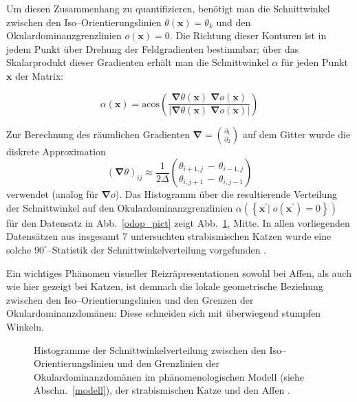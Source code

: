Um diesen Zusammenhang zu quantifizieren, benötigt man die Schnittwinkel
zwischen den Iso--Orientierungslinien $\theta(\mathbf{x})=\theta_k$ und den
Okulardominanzgrenzlinien $o(\mathbf{x}) = 0$.  Die Richtung dieser
Konturen ist in jedem Punkt über Drehung der Feldgradienten bestimmbar;
über das Skalarprodukt dieser Gradienten erhält man die Schnittwinkel
$\alpha$ für jeden Punkt $\mathbf{x}$ der Matrix:

\begin{equation*}
\alpha(\mathbf{x})=\text{acos}\!\left(\frac{\pmb\nabla\theta(\mathbf{x})
\;\pmb\nabla o(\mathbf{x})}{\vert\pmb\nabla\theta(\mathbf{x})\;\pmb\nabla
o(\mathbf{x})\vert}\right)
\end{equation*}

Zur Berechnung des räumlichen Gradienten $\pmb\nabla =
{\partial_1\choose\partial_2}$ auf dem Gitter wurde die diskrete
Approximation
\begin{equation*}
(\pmb\nabla\theta)_{ij}\approx\frac{1}{2\Delta}{{\theta_{i+1,j}\,-\,\theta_{i-1,j}}\choose{\theta_{i,j+1}\,-\,\theta_{i,j-1}}}
\end{equation*}
verwendet (analog für $\pmb\nabla o$). Das Histogramm über die
resultierende Verteilung der Schnittwinkel auf den
Okulardominanzgrenzlinien $\alpha(\left\{\mathbf{x}^\prime\vert\;
o(\mathbf{x}^\prime)=0\right\})$ für den Datensatz in Abb.~\ref{odop_pict}
zeigt Abb.~\ref{odop_hist}, Mitte. In allen vorliegenden Datensätzen aus
insgesamt 7 untersuchten strabismischen Katzen wurde eine solche
$90^\circ$--Statistik der Schnittwinkelverteilung vorgefunden
.

Ein wichtiges Phänomen visueller Reizräpresentationen sowohl bei Affen,
als auch wie hier gezeigt bei Katzen, ist demnach die lokale geometrische
Beziehung zwischen den Iso--Orientierungslinien und den Grenzen der
Okulardominanzdomänen: Diese schneiden sich mit überwiegend stumpfen
Winkeln.

\begin{figure}[t]
\begin{center}
\end{center}
\caption{Histogramme der Schnittwinkelverteilung zwischen den
Iso--Orien\-tier\-ungs\-linien und den Grenzlinien der Okulardominanzdomänen
im phänomenologischen Modell (siehe Abschn.~\ref{modell}), der
strabismischen Katze \protect{} und den Affen
\protect{}.}
\label{odop_hist}
\end{figure}

